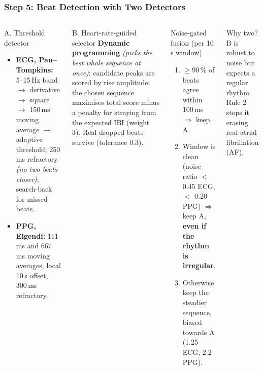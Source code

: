 \documentclass[t,aspectratio=169]{beamer}
\newcommand{\plain}[1]{{\color{gray}\textit{(#1)}}}
\begin{document}
\begin{frame}
\frametitle{Step 5: Beat Detection with Two Detectors}
\begin{columns}[T]
\begin{block}{A. Threshold detector}
\footnotesize
\begin{itemize}
  \item \textbf{ECG, Pan--Tompkins:} 5--15\,Hz band $\to$ derivative $\to$ square $\to$ 150\,ms moving average
        $\to$ adaptive threshold; 250\,ms refractory \plain{no two beats closer}; search-back for missed beats.
  \item \textbf{PPG, Elgendi:} 111\,ms and 667\,ms moving averages, local 10\,s offset, 300\,ms refractory.
\end{itemize}
\end{block}
\begin{block}{B. Heart-rate-guided selector}
\footnotesize
\textbf{Dynamic programming} \plain{picks the best whole sequence at once}: candidate peaks are scored by rise
amplitude; the chosen sequence maximises total score minus a penalty for straying from the expected IBI (weight 3).
Real dropped beats survive (tolerance 0.3).
\end{block}
\begin{exampleblock}{Noise-gated fusion (per 10\,s window)}
\footnotesize
\begin{enumerate}
  \item $\geq$90\,\% of beats agree within 100\,ms $\Rightarrow$ keep A.
  \item Window is clean (noise ratio $<$ 0.45 ECG, $<$ 0.20 PPG) $\Rightarrow$ keep A, \textbf{even if the rhythm
        is irregular}.
  \item Otherwise keep the steadier sequence, biased towards A (1.25 ECG, 2.2 PPG).
\end{enumerate}
\end{exampleblock}
\begin{alertblock}{Why two?}
\footnotesize B is robust to noise but expects a regular rhythm. Rule 2 stops it erasing real atrial
fibrillation (AF).
\end{alertblock}
\end{columns}
\end{frame}
\end{document}
